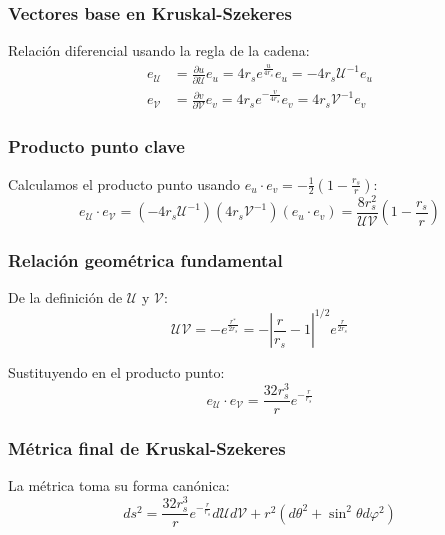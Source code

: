 \subsubsection{Vectores base en Kruskal-Szekeres}
Relación diferencial usando la regla de la cadena:
\begin{equation}
    \begin{aligned}
        e_\mathcal{U} & = \frac{\partial u}{\partial \mathcal{U}} e_u = 4r_s e^{\frac{u}{4r_s}} e_u = -4r_s \mathcal{U}^{-1} e_u \\
        e_\mathcal{V} & = \frac{\partial v}{\partial \mathcal{V}} e_v = 4r_s e^{-\frac{v}{4r_s}} e_v = 4r_s \mathcal{V}^{-1} e_v
    \end{aligned}
\end{equation}

\subsubsection{Producto punto clave}
Calculamos el producto punto usando \( e_u \cdot e_v = -\frac{1}{2}\left(1-\frac{r_s}{r}\right) \):
\begin{equation}
    e_\mathcal{U} \cdot e_\mathcal{V} = (-4r_s \mathcal{U}^{-1})(4r_s \mathcal{V}^{-1})(e_u \cdot e_v) = \frac{8r_s^2}{\mathcal{U}\mathcal{V}}\left(1-\frac{r_s}{r}\right)
\end{equation}

\subsubsection{Relación geométrica fundamental}
De la definición de \( \mathcal{U} \) y \( \mathcal{V} \):
\begin{equation}
    \mathcal{U}\mathcal{V} = -e^{\frac{r^*}{2r_s}} = -\left|\frac{r}{r_s}-1\right|^{1/2}e^{\frac{r}{2r_s}}
\end{equation}

Sustituyendo en el producto punto:
\begin{equation}
    e_\mathcal{U} \cdot e_\mathcal{V} = \frac{32r_s^3}{r}e^{-\frac{r}{r_s}}
\end{equation}

\subsubsection{Métrica final de Kruskal-Szekeres}
La métrica toma su forma canónica:
\begin{equation}
    \boxed{ds^2 = \frac{32r_s^3}{r}e^{-\frac{r}{r_s}} d\mathcal{U}d\mathcal{V} + r^2(d\theta^2 + \sin^2\theta d\varphi^2)}
\end{equation}

